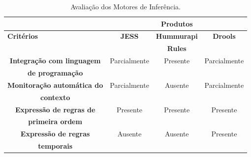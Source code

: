 
\begin{table}[ht]
\caption{Avaliação dos Motores de Inferência.} \label{tab:CompFerram}
\centering
\begin{tabular}{|l|l|l|l|}
\cline{2-4}
\multicolumn{1}{l|}{} & \multicolumn{3}{c|}{\textbf{Produtos}} \\ 
\hline
\textbf{Critérios} & \multicolumn{1}{c|}{\textbf{JESS}} & \multicolumn{1}{c|}{\textbf{Hummurapi} } & \multicolumn{1}{c|}{\textbf{Drools}} \\ 
 & \multicolumn{1}{c|}{} & \multicolumn{1}{c|}{\textbf{Rules}} & \multicolumn{1}{c|}{} \\ 
\hline
\multicolumn{1}{|c|}{\textbf{Integração com linguagem}} & \multicolumn{1}{c|}{Parcialmente} & \multicolumn{1}{c|}{Presente} & \multicolumn{1}{c|}{Parcialmente} \\ 
\multicolumn{1}{|c|}{\textbf{de programação}} & \multicolumn{1}{c|}{} & \multicolumn{1}{c|}{} & \multicolumn{1}{c|}{} \\ 
\hline
\multicolumn{1}{|c|}{\textbf{Monitoração automática do}} & \multicolumn{1}{c|}{Parcialmente} & \multicolumn{1}{c|}{Ausente} & \multicolumn{1}{c|}{Parcialmente} \\ 
\multicolumn{1}{|c|}{\textbf{contexto}} & \multicolumn{1}{c|}{} & \multicolumn{1}{c|}{} & \multicolumn{1}{c|}{} \\ 
\hline
\multicolumn{1}{|c|}{\textbf{Expressão de regras de}} & \multicolumn{1}{c|}{Presente} & \multicolumn{1}{c|}{Presente} & \multicolumn{1}{c|}{Presente} \\ 
\multicolumn{1}{|c|}{\textbf{primeira ordem}} & \multicolumn{1}{c|}{} & \multicolumn{1}{c|}{} & \multicolumn{1}{c|}{} \\ 
\hline
\multicolumn{1}{|c|}{\textbf{Expressão de regras}} & \multicolumn{1}{c|}{Ausente} & \multicolumn{1}{c|}{Ausente} & \multicolumn{1}{c|}{Presente} \\ 
\multicolumn{1}{|c|}{\textbf{temporais}} & \multicolumn{1}{c|}{} & \multicolumn{1}{c|}{} & \multicolumn{1}{c|}{} \\ 
\hline
\end{tabular}
\end{table}